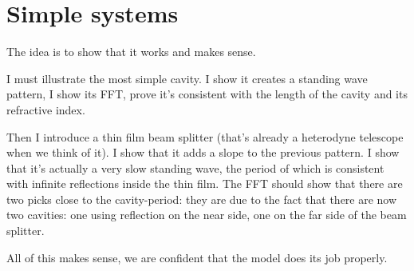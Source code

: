 
\section{Simple systems}

The idea is to show that it works and makes sense.

I must illustrate the most simple cavity.  I show it creates a standing wave pattern, I show its FFT, prove it's consistent with the length of the cavity and its refractive index.

Then I introduce a thin film beam splitter (that's already a heterodyne telescope when we think of it).  I show that it adds a slope to the previous pattern.  I show that it's actually a very slow standing wave, the period of which is consistent with infinite reflections inside the thin film.  The FFT should show that there are two picks close to the cavity-period: they are due to the fact that there are now two cavities: one using reflection on the near side, one on the far side of the beam splitter.

All of this makes sense, we are confident that the model does its job properly.
